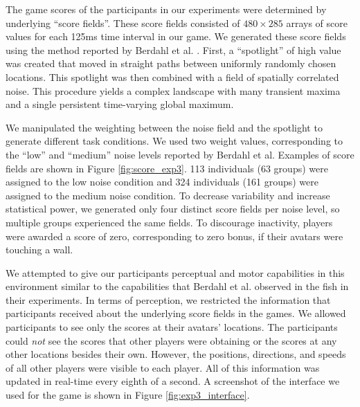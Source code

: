 \documentclass[12pt,letterpaper]{article}
\begin{document}
The game scores of the participants in our experiments were determined
by underlying ``score fields''.  These score fields consisted of $480
\times 285$ arrays of score values for each 125ms time interval in our
game.  We generated these score fields using the method reported by
Berdahl et al. \citeyear{berdahl_emergent_2013}. First, a
``spotlight'' of high value was created that moved in straight paths
between uniformly randomly chosen locations.  This spotlight was then
combined with a field of spatially correlated noise.  This procedure
yields a complex landscape with many transient maxima and a single
persistent time-varying global maximum.

We manipulated the weighting between the noise field and the spotlight
to generate different task conditions.  We used two weight values,
corresponding to the ``low'' and ``medium'' noise levels reported by
Berdahl et al.  Examples of score fields are shown in Figure
\ref{fig:score_exp3}.  113 individuals (63 groups) were assigned to the low
noise condition and 324 individuals (161 groups) were assigned to the
medium noise condition.  To decrease variability and increase
statistical power, we generated only four distinct score fields per
noise level, so multiple groups experienced the same fields.  To
discourage inactivity, players were awarded a score of zero,
corresponding to zero bonus, if their avatars were touching a wall.

We attempted to give our participants perceptual and motor capabilities
in this environment similar to the capabilities that Berdahl et
al. observed in the fish in their experiments.  In terms of
perception, we restricted the information that participants received
about the underlying score fields in the games.  We allowed
participants to see only the scores at their avatars' locations.  The
participants could \emph{not} see the scores that other players were
obtaining or the scores at any other locations besides their own.
However, the positions, directions, and speeds of all other players
were visible to each player.  All of this information was updated in
real-time every eighth of a second.  A screenshot of the interface we
used for the game is shown in Figure \ref{fig:exp3_interface}.
\end{document}
